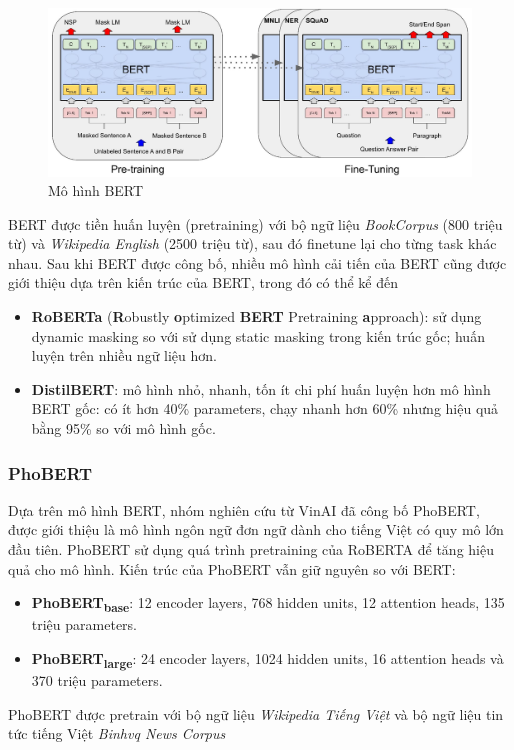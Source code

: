 \documentclass[12pt]{article}
\begin{document}
\begin{figure}[H]
    \centering
    \includegraphics[scale=.65]{img/BERT.jpg}
    \caption{Mô hình BERT\cite{devlin-etal-2019-bert}}
    \label{fig:my_label}
\end{figure}
BERT được tiền huấn luyện (pretraining) với bộ ngữ liệu \textit{BookCorpus} (800 triệu từ) và \textit{Wikipedia English} (2500 triệu từ), sau đó finetune lại cho từng task khác nhau. Sau khi BERT được công bố, nhiều mô hình cải tiến của BERT cũng được giới thiệu dựa trên kiến trúc của BERT, trong đó có thể kể đến
\begin{itemize}
    \item \textbf{RoBERTa} (\textbf{R}obustly \textbf{o}ptimized \textbf{BERT} Pretraining \textbf{a}pproach)\cite{DBLP:journals/corr/abs-1907-11692}: sử dụng dynamic masking so với sử dụng static masking trong kiến trúc gốc; huấn luyện trên nhiều ngữ liệu hơn.
    \item \textbf{DistilBERT}\cite{DBLP:journals/corr/abs-1910-01108}: mô hình nhỏ, nhanh, tốn ít chi phí huấn luyện hơn mô hình BERT gốc: có ít hơn 40\% parameters, chạy nhanh hơn 60\% nhưng hiệu quả bằng 95\% so với mô hình gốc.
\end{itemize}

\subsubsection{PhoBERT}
Dựa trên mô hình BERT, nhóm nghiên cứu từ VinAI đã công bố PhoBERT\cite{phobert}, được giới thiệu là mô hình ngôn ngữ đơn ngữ dành cho tiếng Việt có quy mô lớn đầu tiên. PhoBERT sử dụng quá trình pretraining của RoBERTA để tăng hiệu quả cho mô hình. Kiến trúc của PhoBERT vẫn giữ nguyên so với BERT:
\begin{itemize}
    \item \textbf{PhoBERT\textsubscript{base}}: 12 encoder layers, 768 hidden units, 12 attention heads, 135 triệu parameters.
    \item \textbf{PhoBERT\textsubscript{large}}: 24 encoder layers, 1024 hidden units, 16 attention heads và 370 triệu parameters.
\end{itemize}
PhoBERT được pretrain với bộ ngữ liệu \textit{Wikipedia Tiếng Việt} và bộ ngữ liệu tin tức tiếng Việt \textit{Binhvq News Corpus}
\end{document}
